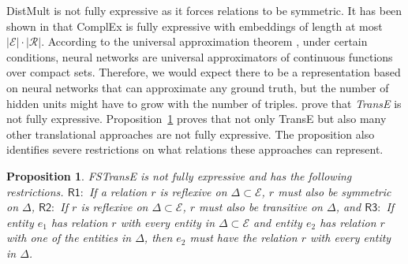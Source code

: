 \documentclass{article}
\newcommand{\entities}{\ensuremath{\mathcal{E}}}
\newcommand{\relations}{\ensuremath{\mathcal{R}}}
\newtheorem{proposition}{Proposition}
\begin{document}
DistMult is not fully expressive as it forces relations to be symmetric. It has been shown in \cite{trouillon2017knowledge} that ComplEx is fully expressive with embeddings of length at most $|\entities|\cdot |\relations|$. According to the universal approximation theorem \cite{cybenko1989approximations,hornik1991approximation}, under certain conditions, neural networks are universal approximators of continuous functions over compact sets. Therefore, we would expect there to be a representation based on neural networks that can approximate any ground truth, but the number of hidden units might have to grow with the number of triples. \citet{wang2017multi} prove that \emph{TransE} is not fully expressive. Proposition~\ref{fstranse-prop} proves that not only TransE but also many other translational approaches are not fully expressive. The proposition also identifies severe restrictions on what relations these approaches can represent. 

\begin{proposition} \label{fstranse-prop}
FSTransE is not fully expressive and has the following restrictions. $\mathsf{R1:}$ If a relation $r$ is reflexive on $\Delta\subset\entities$, $r$ must also be symmetric on $\Delta$, $\mathsf{R2:}$ If $r$ is reflexive on $\Delta\subset\entities$, $r$ must also be transitive on $\Delta$, and $\mathsf{R3:}$ If entity $e_1$ has relation $r$ with every entity in $\Delta\subset\entities$ and entity $e_2$ has relation $r$ with one of the entities in $\Delta$, then $e_2$ must have the relation $r$ with every entity in $\Delta$.
\end{proposition}
\end{document}
